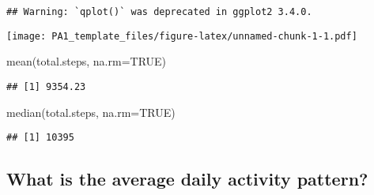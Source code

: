 \documentclass[
]{article}
\newenvironment{Shaded}{\begin{snugshade}}{\end{snugshade}}
\newcommand{\AttributeTok}[1]{\textcolor[rgb]{0.77,0.63,0.00}{#1}}
\newcommand{\ConstantTok}[1]{\textcolor[rgb]{0.00,0.00,0.00}{#1}}
\newcommand{\FunctionTok}[1]{\textcolor[rgb]{0.00,0.00,0.00}{#1}}
\newcommand{\NormalTok}[1]{#1}
\newcommand{\OtherTok}[1]{\textcolor[rgb]{0.56,0.35,0.01}{#1}}
\newcommand{\SpecialCharTok}[1]{\textcolor[rgb]{0.00,0.00,0.00}{#1}}
\newcommand{\StringTok}[1]{\textcolor[rgb]{0.31,0.60,0.02}{#1}}
\begin{document}
\begin{verbatim}
## Warning: `qplot()` was deprecated in ggplot2 3.4.0.
\end{verbatim}

\texttt{[image: PA1\_template\_files/figure-latex/unnamed-chunk-1-1.pdf]}

\begin{Shaded}
\begin{Highlighting}[]
\FunctionTok{mean}\NormalTok{(total.steps, }\AttributeTok{na.rm=}\ConstantTok{TRUE}\NormalTok{)}
\end{Highlighting}
\end{Shaded}

\begin{verbatim}
## [1] 9354.23
\end{verbatim}

\begin{Shaded}
\begin{Highlighting}[]
\FunctionTok{median}\NormalTok{(total.steps, }\AttributeTok{na.rm=}\ConstantTok{TRUE}\NormalTok{)}
\end{Highlighting}
\end{Shaded}

\begin{verbatim}
## [1] 10395
\end{verbatim}

\hypertarget{what-is-the-average-daily-activity-pattern}{%
\subsection{What is the average daily activity
pattern?}\label{what-is-the-average-daily-activity-pattern}}

\begin{Shaded}
\end{Shaded}
\end{document}
